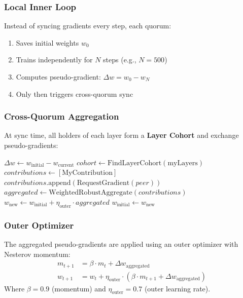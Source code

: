 \documentclass[11pt,a4paper]{article}
\begin{document}
\subsubsection{Local Inner Loop}
Instead of syncing gradients every step, each quorum:
\begin{enumerate}
    \item Saves initial weights $w_0$
    \item Trains independently for $N$ steps (e.g., $N=500$)
    \item Computes pseudo-gradient: $\Delta w = w_0 - w_N$
    \item Only then triggers cross-quorum sync
\end{enumerate}

\subsubsection{Cross-Quorum Aggregation}
At sync time, all holders of each layer form a \textbf{Layer Cohort} and exchange pseudo-gradients:

\begin{algorithm}[H]
\caption{Cross-Quorum Sync (DiLoCo)}
\begin{algorithmic}[1]
    \State $\Delta w \gets w_{\text{initial}} - w_{\text{current}}$ 
    \State $cohort \gets \text{FindLayerCohort}(\text{myLayers})$
    \State $contributions \gets [\text{MyContribution}]$
        \State $contributions.\text{append}(\text{RequestGradient}(peer))$
    \EndFor
    \State $aggregated \gets \text{WeightedRobustAggregate}(contributions)$
    \State $w_{\text{new}} \gets w_{\text{initial}} + \eta_{\text{outer}} \cdot aggregated$
    \State $w_{\text{initial}} \gets w_{\text{new}}$ 
\EndProcedure
\end{algorithmic}
\end{algorithm}

\subsubsection{Outer Optimizer}
The aggregated pseudo-gradients are applied using an outer optimizer with Nesterov momentum:
\begin{align}
m_{t+1} &= \beta \cdot m_t + \Delta w_{\text{aggregated}} \\
w_{t+1} &= w_t + \eta_{\text{outer}} \cdot (\beta \cdot m_{t+1} + \Delta w_{\text{aggregated}})
\end{align}
Where $\beta = 0.9$ (momentum) and $\eta_{\text{outer}} = 0.7$ (outer learning rate).
\end{document}
